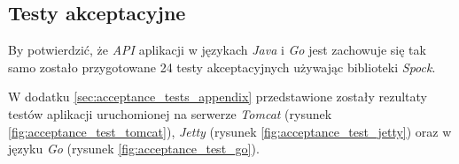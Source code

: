 \subsection{Testy akceptacyjne} 

By potwierdzić, że \textsl{API} aplikacji w językach \textsl{Java} i \textsl{Go} jest zachowuje się tak samo zostało przygotowane 24 testy akceptacyjnych używając biblioteki \textsl{Spock}. 

W dodatku \ref{sec:acceptance_tests_appendix} przedstawione zostały rezultaty testów aplikacji uruchomionej na serwerze \textsl{Tomcat} (rysunek \ref{fig:acceptance_test_tomcat}), \textsl{Jetty} (rysunek \ref{fig:acceptance_test_jetty}) oraz w języku \textsl{Go} (rysunek \ref{fig:acceptance_test_go}).


